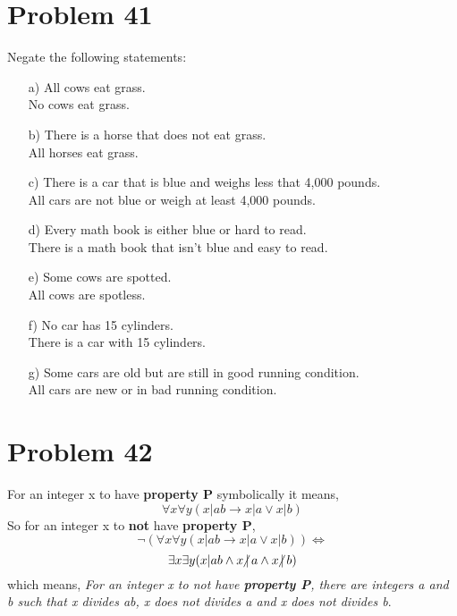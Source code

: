 \documentclass{article}
\newcommand{\ndiv}{\hspace{-4pt}\not|\hspace{2pt}}
\begin{document}
\section*{Problem 41}
Negate the following statements:
\begin{enumerate}
\item[a)] All cows eat grass.\\[.2cm]
No cows eat grass.
\item[b)] There is a horse that does not eat grass.\\[.2cm]
All horses eat grass.
\item[c)] There is a car that is blue and weighs less that 4,000 pounds.\\[.2cm]
All cars are not blue or weigh at least 4,000 pounds.
\item[d)] Every math book is either blue or hard to read.\\[.2cm]
There is a math book that isn't blue and easy to read.
\item[e)] Some cows are spotted.\\[.2cm]
All cows are spotless.
\item[f)] No car has 15 cylinders.\\[.2cm]
There is a car with 15 cylinders.
\item[g)] Some cars are old but are still in good running condition.\\[.2cm]
All cars are new or in bad running condition.
\end{enumerate}

\section*{Problem 42}
For an integer x to have \textbf{property P} symbolically it means,
$$
\forall x \forall y (x \vert ab \to x \vert a \vee x \vert b)
$$
So for an integer x to \textbf{not} have \textbf{property P},
$$
\neg (\forall x \forall y (x \vert ab \to x \vert a \vee x \vert b)) \Leftrightarrow
$$
$$
\exists x \exists y (x \vert ab \wedge x \ndiv a \wedge x \ndiv b)
$$
which means, \textit{For an integer x to not have \textbf{property P}, there are integers a and b such that x divides ab, x does not divides a and x does not divides b}.
\end{document}
